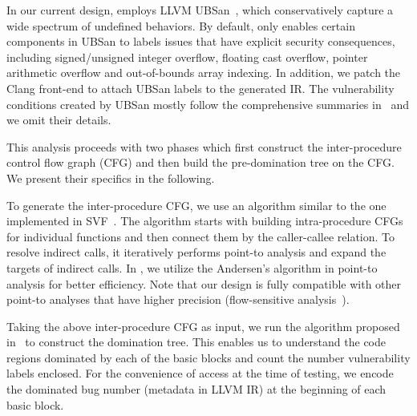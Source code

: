 In our current design, \savior employs 
LLVM UBSan~\cite{ubsanlist}, which conservatively capture 
a wide spectrum of undefined behaviors. 
By default, \savior only enables certain components in UBSan to 
labels issues that have explicit security consequences, 
including signed/unsigned integer overflow, floating cast overflow,
pointer arithmetic overflow and out-of-bounds array indexing. 
In addition, we patch the Clang front-end to attach UBSan labels
to the generated IR. 
The vulnerability conditions created by UBSan mostly follow
the comprehensive summaries in~\cite{wang2013towards} 
and we omit their details. 

 This analysis proceeds with two phases 
which first construct the inter-procedure control flow graph (CFG) and then build the
pre-domination tree on the CFG. We present their specifics in the following.

To generate the inter-procedure CFG, we use an algorithm similar to the one 
implemented in SVF~\cite{sui2016svf}. The algorithm starts with building intra-procedure CFGs for 
individual functions and then connect them by the caller-callee relation.
To resolve indirect calls, it iteratively performs point-to analysis and expand 
the targets of indirect calls. In \savior, we utilize the Andersen's algorithm 
in point-to analysis for better efficiency. Note that our design is fully compatible 
with other point-to analyses that have higher precision 
(\eg flow-sensitive analysis~\cite{hardekopf2011flow}). 

Taking the above inter-procedure CFG as input, we run the algorithm proposed in~\cite{cooper2001simple}
to construct the domination tree. This enables us to understand the code regions dominated by each of 
the basic blocks and count the number vulnerability labels enclosed. 
For the convenience of access at the time of testing, we encode the dominated bug number 
(metadata in LLVM IR) at the beginning of each basic block. 
